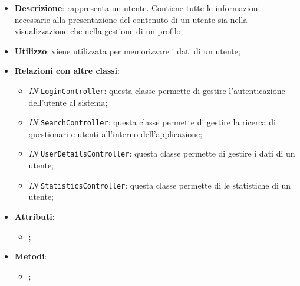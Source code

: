 		\begin{itemize}
			\item \textbf{Descrizione}: rappresenta un utente. Contiene tutte le informazioni necessarie alla
			presentazione del contenuto di un utente sia nella visualizzazione che nella gestione di un profilo;
			\item \textbf{Utilizzo}: viene utilizzata per memorizzare i dati di un utente;
			\item \textbf{Relazioni con altre classi}: 
			\begin{itemize}
				\item \textit{IN} \texttt{LoginController}: questa classe permette di gestire l'autenticazione dell'utente al sistema;
				\item \textit{IN} \texttt{SearchController}: questa classe permette di gestire la ricerca di questionari e utenti all'interno dell'applicazione;
				\item \textit{IN} \texttt{UserDetailsController}: questa classe permette di gestire i dati di un utente;
				\item \textit{IN} \texttt{StatisticsController}: questa classe permette di le statistiche di un utente;
			\end{itemize}
			\item \textbf{Attributi}: 
			\begin{itemize}
				\item ;
			\end{itemize}
			\item \textbf{Metodi}: 
			\begin{itemize}
				\item ;
			\end{itemize}
		\end{itemize}														